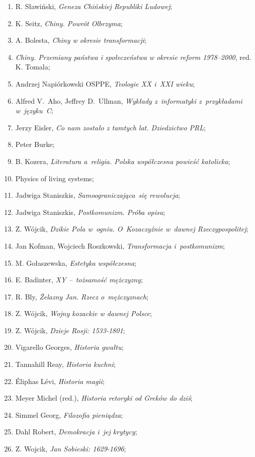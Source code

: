 \documentclass[a4paper,11pt]{article}
\begin{document}
\begin{enumerate}
\item R. Sławiński, \emph{Geneza Chińskiej Republiki Ludowej};
\item K. Seitz, \emph{Chiny. Powrót Olbrzyma};
\item A. Bolesta, \emph{Chiny w okresie transformacji};
\item \emph{Chiny. Przemiany państwa i społeczeństwa w okresie reform
    1978--2000}, red. K. Tomala;
\item Andrzej Napiórkowski OSPPE, \emph{Teologie XX i~XXI wieku};
\item Alfred V.~Aho, Jeffrey D.~Ullman, \emph{Wykłady z~informatyki
    z~przykładami w~języku~C};
\item Jerzy Eisler, \emph{Co nam zostało z tamtych lat. Dziedzictwo
    PRL};
\item Peter Burke;
\item B. Kozera, \emph{Literatura a~religia. Polska współczesna
    powieść katolicka};
\item Physics of living systems;
\item Jadwiga Staniszkis, \emph{Samoograniczająca~się rewolucja};
\item Jadwiga Staniszkis, \emph{Postkomunizm. Próba opisu};
\item Z. Wójcik, \emph{Dzikie Pola w~ogniu. O~Kozaczyźnie w~dawnej
    Rzeczypospolitej};
\item Jan Kofman, Wojciech Roszkowski, \emph{Transformacja
    i~postkomunizm};
\item M. Gołaszewska, \emph{Estetyka współczesna};
\item E. Badinter, \emph{XY --~tożsamość mężczyzny};
\item R. Bly, \emph{Żelazny Jan. Rzecz o~mężczyznach};
\item Z. Wójcik, \emph{Wojny kozackie w dawnej Polsce};
\item Z. Wójcik, \emph{Dzieje Rosji: 1533-1801};
\item Vigarello Georges, \emph{Historia gwałtu};
\item Tannahill Reay, \emph{Historia kuchni};
\item Éliphas Lévi, \emph{Historia magii};
\item Meyer Michel (red.), \emph{Historia retoryki od Greków do dziś};
\item Simmel Georg, \emph{Filozofia pieniądza};
\item Dahl Robert, \emph{Demokracja i~jej krytycy};
\item Z. Wojcik, \emph{Jan Sobieski: 1629-1696};

\end{enumerate}
\end{document}
